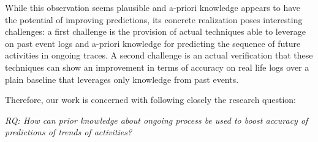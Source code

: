 While this observation seems plausible and a-priori knowledge appears to have the potential of improving predictions, its concrete realization poses interesting challenges: a first challenge is the provision of actual techniques able to leverage on past event logs and a-priori knowledge for predicting the sequence of future activities in ongoing traces. A second challenge is an actual verification that these techniques can show an improvement in terms of accuracy on real life logs over a plain baseline that leverages only knowledge from past events.

Therefore, our work is concerned with following closely the research question:

\textit{RQ: How can prior knowledge about ongoing process be used to boost accuracy of predictions of trends of activities?}


